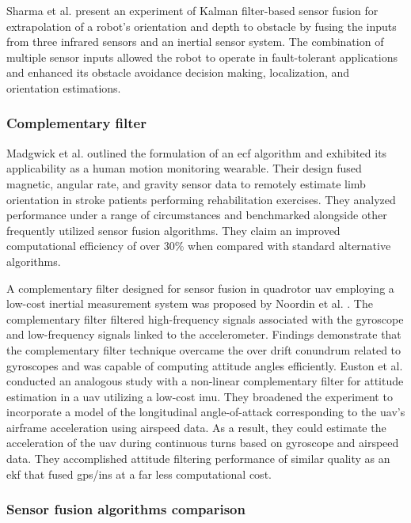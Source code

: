 Sharma et al. \cite{sharma2014sensor} present an experiment of Kalman filter-based sensor fusion for extrapolation of a robot's orientation and depth to obstacle by fusing the inputs from three infrared sensors and an inertial sensor system. The combination of multiple sensor inputs allowed the robot to operate in fault-tolerant applications and enhanced its obstacle avoidance decision making, localization, and orientation estimations.

\subsubsection{Complementary filter}

Madgwick et al. \cite{madgwick2020extended} outlined the formulation of an \acrfull{ecf} algorithm and exhibited its applicability as a human motion monitoring wearable. Their design fused magnetic, angular rate, and gravity sensor data to remotely estimate limb orientation in stroke patients performing rehabilitation exercises. They analyzed performance under a range of circumstances and benchmarked alongside other frequently utilized sensor fusion algorithms. They claim an improved computational efficiency of over 30\% when compared with standard alternative algorithms.

A complementary filter designed for sensor fusion in quadrotor \acrshort{uav} employing a low-cost inertial measurement system was proposed by Noordin et al. \cite{noordin2018sensor}. The complementary filter filtered high-frequency signals associated with the gyroscope and low-frequency signals linked to the accelerometer. Findings demonstrate that the complementary filter technique overcame the over drift conundrum related to gyroscopes and was capable of computing attitude angles efficiently.
Euston et al. \cite{euston2008complementary} conducted an analogous study with a non-linear complementary filter for attitude estimation in a \acrshort{uav} utilizing a low-cost \acrshort{imu}. They broadened the experiment to incorporate a model of the longitudinal angle-of-attack corresponding to the \acrshort{uav}'s airframe acceleration using airspeed data. As a result, they could estimate the acceleration of the \acrshort{uav} during continuous turns based on gyroscope and airspeed data. They accomplished attitude filtering performance of similar quality as an \acrshort{ekf} that fused \acrshort{gps}/\acrshort{ins} at a far less computational cost.

\subsubsection{Sensor fusion algorithms comparison}

